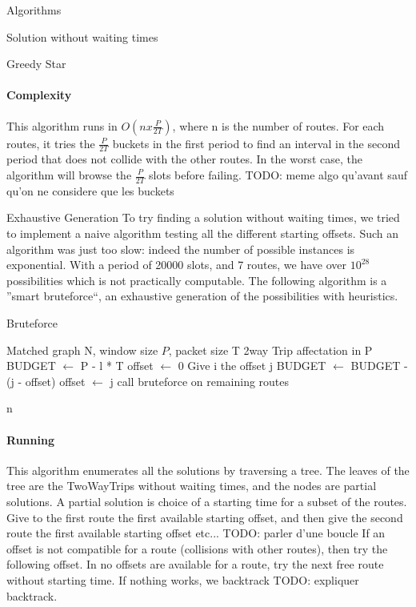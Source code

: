 \documentclass[a4paper,10pt]{report}
\newcommand{\todo}[1]{}
\renewcommand{\todo}[1]{{\color{red} TODO: {#1}}}
\begin{document}
\begin{chapter}{Algorithms}
\begin{section}{Solution without waiting times}
\begin{subsection}{Greedy Star}
\paragraph{Complexity}
This algorithm runs in $O(n x \frac{P}{2T})$, where n is the number of routes. For each routes, it tries the $\frac{P}{2T}$ buckets in
the first period to find an interval in the second period that does not collide with the other routes. In the worst case, the 
algorithm will browse the $\frac{P}{2T}$ slots before failing.
\todo{meme algo qu'avant sauf qu'on ne considere que les buckets}
\end{subsection}


\begin{subsection}{Exhaustive Generation}
 To try finding a solution without waiting times, we tried to implement a naive algorithm testing all the different starting offsets.
 Such an algorithm was just too slow: indeed the number of possible instances is exponential. With a period of 20000 slots,
 and 7 routes, we have over $10^{28}$ possibilities which is not practically computable.
 The following algorithm is a ''smart bruteforce``, an exhaustive generation of the possibilities with heuristics.
 
\begin{algorithm}[H]
\caption{Bruteforce}
\begin{algorithmic}
\REQUIRE Matched graph N, window size $P$, packet size T
\ENSURE 2way Trip affectation in P
\STATE BUDGET $\leftarrow$ P - l * T
\STATE offset $\leftarrow$ 0
\STATE Give i the offset j
\STATE BUDGET $\leftarrow$ BUDGET - (j - offset)
\STATE offset $\leftarrow$ j
\STATE call bruteforce on remaining routes
\ENDIF
\ENDFOR
\ENDFOR


\end{algorithmic}
\end{algorithm}n

\paragraph{Running} This algorithm enumerates all the solutions by traversing a tree. The leaves of the tree are 
the TwoWayTrips without waiting times, and the nodes are partial solutions. A partial solution is choice of a starting time for a subset of the routes.
Give to the first route the first available starting offset, and then give the second route the first available starting offset etc...
\todo{parler d'une boucle}
If an offset is not compatible for a route (collisions with other routes), then try the following offset. In no offsets are available for a route,
try the next free route without starting time.
If nothing works, we backtrack \todo{expliquer backtrack}.


\end{subsection}
\end{section}
\end{chapter}
\end{document}
